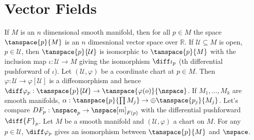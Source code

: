 \documentclass{article}                                                        %
\begin{document}
    \section{Vector Fields}
        If $M$ is an $n$ dimensional smooth manifold, then for all $p\in{M}$ the
        space $\tanspace{p}{M}$ is an $n$ dimesnional vector space over
        $\mathbb{R}$. If $\mathcal{U}\subseteq{M}$ is open, $p\in\mathcal{U}$,
        then $\tanspace{p}{\mathcal{U}}$ is isomorphic to $\tanspace{p}{M}$
        with the inclusion map $\iota:\mathcal{U}\rightarrow{M}$ giving the
        isomorphism $\diff\iota_{p}$ (th differential pushforward of $\iota$).
        Let $(\mathcal{U},\varphi)$ be a coordinate chart at $p\in{M}$. Then
        $\varphi:\mathcal{U}\rightarrow\varphi[\mathcal{U}]$ is a diffeomorphism
        and hence $\diff\varphi_{p}:\tanspace{p}{\mathcal{U}}\rightarrow%
        \tanspace{\varphi(o)}{\nspace}$. If $M_{1},\dots,M_{k}$ are smooth
        manifolds, $\alpha:\tanspace{p}{\prod{M}_{j}}\rightarrow\oplus%
        \tanspace{p_{j}}{M_{j}}$. Let's compare
        $DF_{p}:\nspace_{p}\rightarrow\nspace[m]_{F(p)}$ with the differential
        pushforward $\diff{F}_{p}$. Let $M$ be a smooth manifold and
        $(\mathcal{U},\varphi)$ a chart on $M$. For any $p\in\mathcal{U}$,
        $\diff\varphi_{p}$ gives an isomorphism between $\tanspace{p}{M}$
        and $\nspace$.
\end{document}
